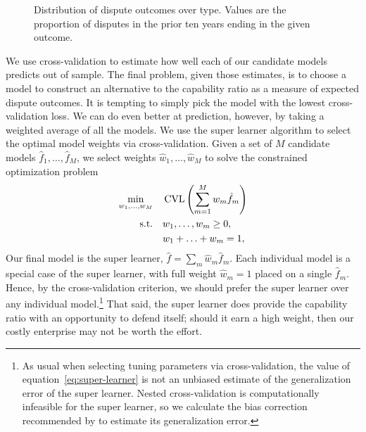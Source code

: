 \begin{figure}[tp]
  \centering
  
  \caption{
    Distribution of dispute outcomes over type.
    Values are the proportion of disputes in the prior ten years ending in the given outcome.
  }
  \label{fig:outcomes-time}
\end{figure}

We use cross-validation to estimate how well each of our candidate models predicts out of sample.
The final problem, given those estimates, is to choose a model to construct an alternative to the capability ratio as a measure of expected dispute outcomes.
It is tempting to simply pick the model with the lowest cross-validation loss.
We can do even better at prediction, however, by taking a weighted average of all the models.
We use the super learner algorithm \citep{vanderLaan:bz} to select the optimal model weights via cross-validation.
Given a set of $M$ candidate models $\hat{f}_1, \ldots, \hat{f}_M$, we select weights $\hat{w}_1, \ldots, \hat{w}_M$ to solve the constrained optimization problem
\begin{equation}
  \label{eq:super-learner}
  \begin{aligned}
    \min_{w_1, \ldots, w_M}
    &\quad
    \operatorname{CVL} \left(
      \sum_{m=1}^M w_m \hat{f}_m
    \right)
    \\
    \mbox{s.t.}
    &\quad
    w_1, \ldots, w_m \geq 0,
    \\
    &\quad
    w_1 + \ldots + w_m = 1,
  \end{aligned}
\end{equation}
Our final model is the super learner, $\hat{f} = \sum_m \hat{w}_m \hat{f}_m$.
Each individual model is a special case of the super learner, with full weight $\hat{w}_m = 1$ placed on a single $\hat{f}_m$.
Hence, by the cross-validation criterion, we should prefer the super learner over any individual model.\footnote{%
  \label{fn:sl-bias}
  As usual when selecting tuning parameters via cross-validation, the value of equation~\eqref{eq:super-learner} is not an unbiased estimate of the generalization error of the super learner.
  Nested cross-validation is computationally infeasible for the super learner, so we calculate the bias correction recommended by \citet{Tibshirani:2009tz} to estimate its generalization error.
}  That said, the super learner does provide the capability ratio with an opportunity to defend itself; should it earn a high weight, then our costly enterprise may not be worth the effort.

